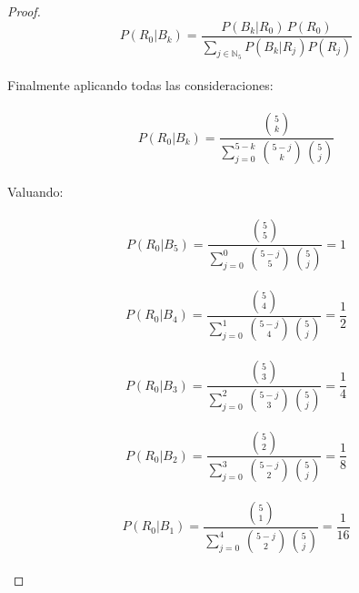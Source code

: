 \documentclass[11pt,letterpaper]{article}
\newcommand{\N}{\mathbb{N}}
\begin{document}
\begin{proof}
\,\\
\begin{equation*}
    P(R_0|B_k)=\frac{P(B_k|R_0)\,P(R_0)}{\sum_{j\in \N_5}P(B_k|R_j)P(R_j)}
\end{equation*}\,\\
Finalmente aplicando todas las consideraciones:\,\\
\,\\
\begin{equation*}
    P(R_0|B_k)=\frac{\displaystyle\binom{5}{k}}{\displaystyle\sum_{j=0}^{5-k}\,\binom{5-j}{k}\,\binom{5}{j}}
\end{equation*}\,\\
Valuando:\,\\
\,\
\begin{equation*}
    P(R_0|B_5)=\frac{\displaystyle \binom{5}{5}}{\displaystyle\sum_{j=0}^{0}\,\binom{5-j}{5}\,\binom{5}{j}}=1
\end{equation*}\,\\
\begin{equation*}
    P(R_0|B_4)=\frac{\displaystyle\binom{5}{4}}{\displaystyle\sum_{j=0}^{1}\,\binom{5-j}{4}\,\binom{5}{j}}=\frac{1}{2}
\end{equation*}\,\\
\begin{equation*}
    P(R_0|B_3)=\frac{\displaystyle\binom{5}{3}}{\displaystyle\sum_{j=0}^{2}\,\binom{5-j}{3}\,\binom{5}{j}}=\frac{1}{4}
\end{equation*}\,\\
\begin{equation*}
    P(R_0|B_2)=\frac{\displaystyle\binom{5}{2}}{\displaystyle\sum_{j=0}^{3}\,\binom{5-j}{2}\,\binom{5}{j}}=\frac{1}{8}
\end{equation*}\,\\
\begin{equation*}
    P(R_0|B_1)=\frac{\displaystyle\binom{5}{1}}{\displaystyle\sum_{j=0}^{4}\,\binom{5-j}{2}\,\binom{5}{j}}=\frac{1}{16}
\end{equation*}\,\\
\end{proof}
\end{document}
